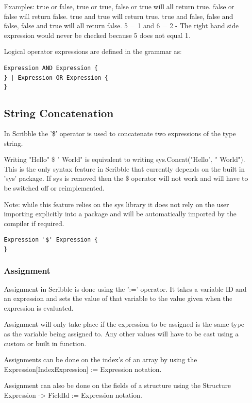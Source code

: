 \documentclass[]{final_report}
\begin{document}
Examples:
true or false, true or true, false or true will all return true.
false or false will return false.
true and true will return true.
true and false, false and false, false and true will all return false.
5 = 1 and 6 = 2 - The right hand side expression would never be checked because 5 does not equal 1.

Logical operator expressions are defined in the grammar as:
\begin{verbatim}
Expression AND Expression {
} | Expression OR Expression {
}
\end{verbatim}

\subsection{String Concatenation}

In Scribble the '\$' operator is used to concatenate two expressions of the type string.

Writing "Hello" \$ " World" is equivalent to writing sys.Concat("Hello", " World"). This is the only syntax feature in Scribble that currently depends on the built in 'sys' package. If sys is removed then the \$ operator will not work and will have to be switched off or reimplemented.

Note: while this feature relies on the sys library it does not rely on the user importing explicitly into a package and will be automatically imported by the compiler if required.

\begin{verbatim}
Expression '$' Expression {
}
\end{verbatim}

\subsubsection{Assignment}

Assignment in Scribble is done using the ':=' operator. It takes a variable ID and an expression and sets the value of that variable to the value given when the expression is evaluated.

Assignment will only take place if the expression to be assigned is the same type as the variable being assigned to. Any other values will have to be cast using a custom or built in function.

Assignments can be done on the index's of an array by using the Expression[IndexExpression] := Expression notation.

Assignment can also be done on the fields of a structure using the Structure Expression -> FieldId := Expression notation. 
\end{document}
